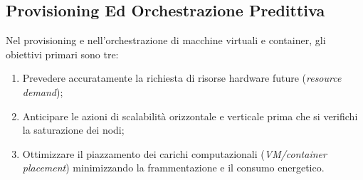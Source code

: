 \documentclass[11pt, a4paper]{article}
\begin{document}
\subsection{Provisioning Ed Orchestrazione Predittiva}

Nel provisioning e nell'orchestrazione di macchine virtuali e container, gli obiettivi primari sono tre:
\begin{enumerate}
    \item Prevedere accuratamente la richiesta di risorse hardware future (\emph{resource demand});
    \item Anticipare le azioni di scalabilità orizzontale e verticale prima che si verifichi la saturazione dei nodi;
    \item Ottimizzare il piazzamento dei carichi computazionali (\emph{VM/container placement}) minimizzando la frammentazione e il consumo energetico.
\end{enumerate}
\end{document}
